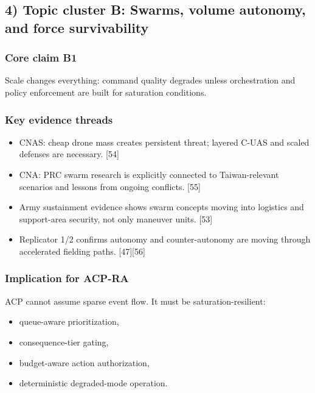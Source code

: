 \documentclass[11pt]{article}
\begin{document}
\hypertarget{topic-cluster-b-swarms-volume-autonomy-and-force-survivability}{%
\subsection{4) Topic cluster B: Swarms, volume autonomy, and force
survivability}\label{topic-cluster-b-swarms-volume-autonomy-and-force-survivability}}

\hypertarget{core-claim-b1}{%
\subsubsection{Core claim B1}\label{core-claim-b1}}

Scale changes everything: command quality degrades unless orchestration
and policy enforcement are built for saturation conditions.

\hypertarget{key-evidence-threads-1}{%
\subsubsection{Key evidence threads}\label{key-evidence-threads-1}}

\begin{itemize}
\tightlist
\item
  CNAS: cheap drone mass creates persistent threat; layered C-UAS and
  scaled defenses are necessary. {[}54{]}
\item
  CNA: PRC swarm research is explicitly connected to Taiwan-relevant
  scenarios and lessons from ongoing conflicts. {[}55{]}
\item
  Army sustainment evidence shows swarm concepts moving into logistics
  and support-area security, not only maneuver units. {[}53{]}
\item
  Replicator 1/2 confirms autonomy and counter-autonomy are moving
  through accelerated fielding paths. {[}47{]}{[}56{]}
\end{itemize}

\hypertarget{implication-for-acp-ra-1}{%
\subsubsection{Implication for ACP-RA}\label{implication-for-acp-ra-1}}

ACP cannot assume sparse event flow. It must be saturation-resilient:

\begin{itemize}
\tightlist
\item
  queue-aware prioritization,
\item
  consequence-tier gating,
\item
  budget-aware action authorization,
\item
  deterministic degraded-mode operation.
\end{itemize}
\end{document}
